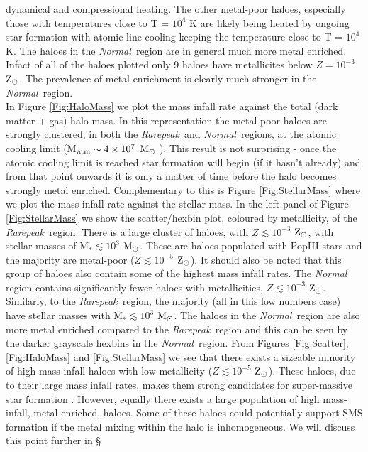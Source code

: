 \documentclass[graphics, twocolumn, usenatbib]{mn2e}
\newcommand{\msolar} {$\rm{M_{\odot}}~$}
\newcommand{\msolarc} {$\rm{M_{\odot}}$}
\newcommand{\zsolarc} {$\rm{Z_{\odot}}$}
\newcommand{\rarepeak} {\textit{Rarepeak~}}
\newcommand{\normal} {\textit{Normal~}}
\begin{document}
dynamical and compressional heating. The other metal-poor haloes, especially those with temperatures
close to T = $10^4$ K are likely being heated by ongoing star formation with atomic line
cooling keeping the temperature close to T = $10^4$ K. 
The haloes in the \normal region are in general much more metal enriched. Infact of
all of the haloes plotted only 9 haloes have metallicites below  $Z = 10^{-3}$ \zsolarc. The
prevalence of metal enrichment is clearly much stronger in the \normal region.\\
\indent In Figure \ref{Fig:HaloMass} we plot the mass infall rate against the total (dark matter
+ gas) halo mass. In this representation the metal-poor haloes are strongly clustered, in both
the \rarepeak and \normal regions, at the atomic cooling limit (M$_{\rm atm} \sim 4 \times 10^7$
\msolar). This result is not surprising - once the atomic cooling limit is reached star formation
will begin (if it hasn't already) and from that point onwards it is only a matter of time before
the halo becomes strongly metal enriched. Complementary to this is Figure \ref{Fig:StellarMass}
where we plot the mass infall rate against the stellar mass. In the left panel of Figure
\ref{Fig:StellarMass} we show the scatter/hexbin plot, coloured by metallicity, of the
\rarepeak region. There is a large cluster of haloes, with $Z \lesssim 10^{-3}$ \zsolarc,
with stellar masses of M$_{*} \lesssim 10^3$ \msolarc. These are haloes
populated with PopIII stars and the majority are metal-poor ($Z \lesssim 10^{-5}$ \zsolarc). It should also be
noted that this group of haloes also contain some of the highest mass infall rates. The \normal
region contains significantly fewer haloes with metallicities, $Z \lesssim 10^{-3}$ \zsolarc. Similarly, to the
\rarepeak region, the majority (all in this low numbers case) have stellar masses with
M$_{*} \lesssim 10^3$ \msolarc. The haloes in the \normal region are also more metal enriched compared
to the \rarepeak region and this can be seen by the darker grayscale hexbins in the \normal region.
From Figures \ref{Fig:Scatter}, \ref{Fig:HaloMass} and \ref{Fig:StellarMass} we see that there exists
a sizeable minority of high mass infall haloes with low metallicity ($Z \lesssim 10^{-5}$ \zsolarc). These
haloes, due to their large mass infall rates, makes them strong candidates for super-massive
star formation \citep{Woods_2018, Chon_2020}. However, equally there exists a large population of
high mass-infall, metal enriched, haloes. Some of these haloes could potentially support SMS formation
if the metal mixing within the halo is inhomogeneous. We will discuss this point further in \S
\end{document}
